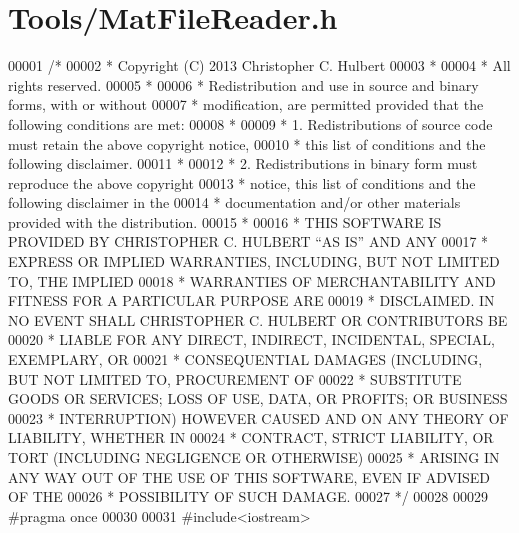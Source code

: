 \hypertarget{_tools_2_mat_file_reader_8h_source}{}\section{Tools/\+Mat\+File\+Reader.h}
\label{_tools_2_mat_file_reader_8h_source}

\begin{DoxyCode}
00001 \textcolor{comment}{/*}
00002 \textcolor{comment}{* Copyright (C) 2013   Christopher C. Hulbert}
00003 \textcolor{comment}{*}
00004 \textcolor{comment}{* All rights reserved.}
00005 \textcolor{comment}{*}
00006 \textcolor{comment}{* Redistribution and use in source and binary forms, with or without}
00007 \textcolor{comment}{* modification, are permitted provided that the following conditions are met:}
00008 \textcolor{comment}{*}
00009 \textcolor{comment}{*    1. Redistributions of source code must retain the above copyright notice,}
00010 \textcolor{comment}{*       this list of conditions and the following disclaimer.}
00011 \textcolor{comment}{*}
00012 \textcolor{comment}{*    2. Redistributions in binary form must reproduce the above copyright}
00013 \textcolor{comment}{*       notice, this list of conditions and the following disclaimer in the}
00014 \textcolor{comment}{*       documentation and/or other materials provided with the distribution.}
00015 \textcolor{comment}{*}
00016 \textcolor{comment}{* THIS SOFTWARE IS PROVIDED BY CHRISTOPHER C. HULBERT ``AS IS'' AND ANY}
00017 \textcolor{comment}{* EXPRESS OR IMPLIED WARRANTIES, INCLUDING, BUT NOT LIMITED TO, THE IMPLIED}
00018 \textcolor{comment}{* WARRANTIES OF MERCHANTABILITY AND FITNESS FOR A PARTICULAR PURPOSE ARE}
00019 \textcolor{comment}{* DISCLAIMED. IN NO EVENT SHALL CHRISTOPHER C. HULBERT OR CONTRIBUTORS BE}
00020 \textcolor{comment}{* LIABLE FOR ANY DIRECT, INDIRECT, INCIDENTAL, SPECIAL, EXEMPLARY, OR}
00021 \textcolor{comment}{* CONSEQUENTIAL DAMAGES (INCLUDING, BUT NOT LIMITED TO, PROCUREMENT OF}
00022 \textcolor{comment}{* SUBSTITUTE GOODS OR SERVICES; LOSS OF USE, DATA, OR PROFITS; OR BUSINESS}
00023 \textcolor{comment}{* INTERRUPTION) HOWEVER CAUSED AND ON ANY THEORY OF LIABILITY, WHETHER IN}
00024 \textcolor{comment}{* CONTRACT, STRICT LIABILITY, OR TORT (INCLUDING NEGLIGENCE OR OTHERWISE)}
00025 \textcolor{comment}{* ARISING IN ANY WAY OUT OF THE USE OF THIS SOFTWARE, EVEN IF ADVISED OF THE}
00026 \textcolor{comment}{* POSSIBILITY OF SUCH DAMAGE.}
00027 \textcolor{comment}{*/}
00028 
00029 \textcolor{preprocessor}{#pragma once}
00030 
00031 \textcolor{preprocessor}{#include<iostream>}

\end{DoxyCode}
